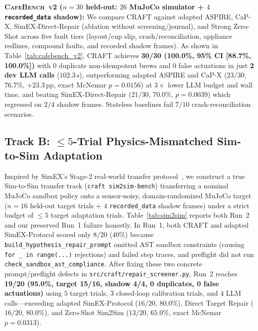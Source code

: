 \documentclass[10pt,journal]{IEEEtran}
\begin{document}
\textbf{\textsc{CafeBench~v2} ($n{=}30$ held-out: $26$ MuJoCo simulator + $4$ \texttt{recorded\_data} shadow):} We compare CRAFT against adapted ASPIRE, CaP-X, SimEX-Direct-Repair (ablation without screening/journal), and Strong Zero-Shot across five fault tiers (layout/cup slip, crash/reconciliation, appliance redlines, compound faults, and recorded shadow frames). As shown in Table~\ref{tab:cafebench_v2}, CRAFT achieves \textbf{30/30 (100.0\%, 95\% CI [88.7\%, 100.0\%])} with $0$ duplicate non-idempotent brews and $0$ false actuations in just \textbf{2 dev LLM calls} ($102.3\,\mathrm{s}$), outperforming adapted ASPIRE and CaP-X ($23/30$, $76.7\%$, $+23.3\,\mathrm{pp}$, exact McNemar $p{=}0.0156$) at $3\times$ lower LLM budget and wall time, and beating SimEX-Direct-Repair ($21/30$, $70.0\%$, $p{=}0.0039$) which regressed on $2/4$ shadow frames. Stateless baselines fail $7/10$ crash-reconciliation scenarios.

\begin{table}[t]
\centering
\caption{\textsc{CafeBench~v2} Held-Out Results ($n{=}30$: $26$ \texttt{simulator} + $4$ \texttt{recorded\_data}, Matched \texttt{gpt-6-astra}).}
\label{tab:cafebench_v2}
\resizebox{\linewidth}{!}{}
\end{table}

\subsection{Track B: $\le 5$-Trial Physics-Mismatched Sim-to-Sim Adaptation}
Inspired by SimEX's Stage-2 real-world transfer protocol~\cite{hu2026simex}, we construct a true Sim-to-Sim transfer track (\texttt{craft sim2sim-bench}) transferring a nominal MuJoCo sandbox policy onto a sensor-noisy, domain-randomized MuJoCo target ($n{=}16$ held-out target trials + $4$ \texttt{recorded\_data} shadow frames) under a strict budget of $\le 5$ target adaptation trials. Table~\ref{tab:sim2sim} reports both Run~2 and our preserved Run~1 failure honestly. In Run~1, both CRAFT and adapted SimEX-Protocol scored only $8/20$ ($40\%$) because \texttt{build\_hypothesis\_repair\_prompt} omitted AST sandbox constraints (causing \texttt{for \_ in range(...)} rejections) and failed step traces, and preflight did not run \texttt{check\_sandbox\_ast\_compliance}. After fixing these two concrete prompt/preflight defects in \texttt{src/craft/repair\_screener.py}, Run~2 reaches \textbf{19/20 (95.0\%, target 15/16, shadow 4/4, 0 duplicates, 0 false actuations)} using $5$ target trials, $3$ closed-loop calibration trials, and $4$ LLM calls---exceeding adapted SimEX-Protocol ($16/20$, $80.0\%$), Direct Target Repair ($16/20$, $80.0\%$), and Zero-Shot Sim2Sim ($13/20$, $65.0\%$, exact McNemar $p{=}0.0313$).
\end{document}
